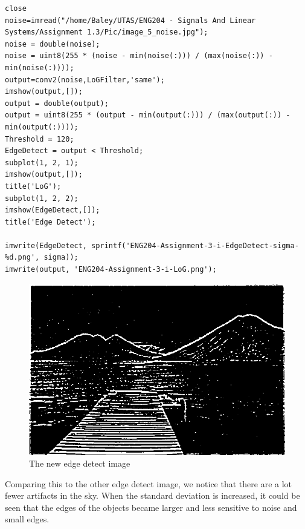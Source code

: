\documentclass[11pt]{article}
\begin{document}
\begin{verbatim}
close
noise=imread("/home/Baley/UTAS/ENG204 - Signals And Linear Systems/Assignment 1.3/Pic/image_5_noise.jpg");
noise = double(noise);
noise = uint8(255 * (noise - min(noise(:))) / (max(noise(:)) - min(noise(:))));
output=conv2(noise,LoGFilter,'same');
imshow(output,[]);
output = double(output);
output = uint8(255 * (output - min(output(:))) / (max(output(:)) - min(output(:))));
Threshold = 120;
EdgeDetect = output < Threshold;
subplot(1, 2, 1);
imshow(output,[]);
title('LoG');
subplot(1, 2, 2);
imshow(EdgeDetect,[]);
title('Edge Detect');

imwrite(EdgeDetect, sprintf('ENG204-Assignment-3-i-EdgeDetect-sigma-%d.png', sigma));
imwrite(output, 'ENG204-Assignment-3-i-LoG.png');
\end{verbatim}
\begin{FIGURE}
\begin{figure}[H]
\centering
\includegraphics[width=.9\linewidth]{ENG204-Assignment-3-i-EdgeDetect-sigma-2.png}
\caption{The new edge detect image}
\end{figure}
\end{FIGURE}
Comparing this to the other edge detect image, we notice that there are a lot fewer artifacts in the sky. When the standard deviation is increased, it could be seen that the edges of the objects became larger and less sensitive to noise and small edges.
\end{document}

